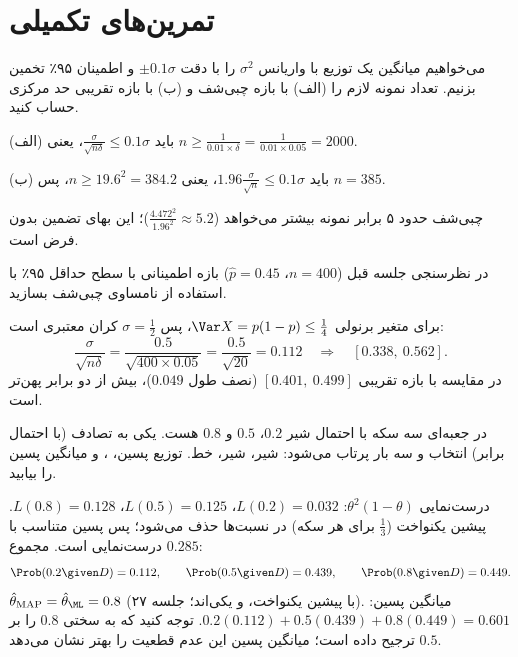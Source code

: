\section{تمرین‌های تکمیلی}

\begin{exercise}
می‌خواهیم میانگین یک توزیع با واریانس $\sigma^2$ را با دقت $\pm0.1\sigma$ و اطمینان ۹۵٪ تخمین بزنیم. تعداد نمونه لازم را (الف) با بازه چبی‌شف و (ب) با بازه تقریبی حد مرکزی حساب کنید.
\end{exercise}
\begin{solution}
(الف) باید $\frac{\sigma}{\sqrt{n\delta}}\le0.1\sigma$، یعنی $n\ge\frac{1}{0.01\times\delta}=\frac{1}{0.01\times0.05}=2000$.

(ب) باید $1.96\frac{\sigma}{\sqrt n}\le0.1\sigma$، یعنی $n\ge19.6^2=384.2$، پس $n=385$.

چبی‌شف حدود ۵ برابر نمونه بیشتر می‌خواهد ($\frac{4.472^2}{1.96^2}\approx5.2$)؛ این بهای تضمین بدون فرض است.
\end{solution}

\begin{exercise}
در نظرسنجی جلسه قبل ($n=400$، $\hat p=0.45$) بازه اطمینانی با سطح حداقل ۹۵٪ با استفاده از نامساوی چبی‌شف بسازید.
\end{exercise}
\begin{solution}
برای متغیر برنولی $\Var X=p(1-p)\le\frac14$، پس $\sigma=\frac12$ کران معتبری است:
\[
\frac{\sigma}{\sqrt{n\delta}}=\frac{0.5}{\sqrt{400\times0.05}}=\frac{0.5}{\sqrt{20}}=0.112
\quad\Rightarrow\quad[0.338,\ 0.562].
\]
در مقایسه با بازه تقریبی $[0.401,\ 0.499]$ (نصف طول $0.049$)، بیش از دو برابر پهن‌تر است.
\end{solution}

\begin{exercise}[سه سکه]
در جعبه‌ای سه سکه با احتمال شیر $0.2$، $0.5$ و $0.8$ هست. یکی به تصادف (با احتمال برابر) انتخاب و سه بار پرتاب می‌شود: شیر، شیر، خط. توزیع پسین، ،  و میانگین پسین را بیابید.
\end{exercise}
\begin{solution}
درست‌نمایی $\theta^2(1-\theta)$: $L(0.2)=0.032$، $L(0.5)=0.125$، $L(0.8)=0.128$. پیشین یکنواخت ($\frac13$ برای هر سکه) در نسبت‌ها حذف می‌شود؛ پس پسین متناسب با درست‌نمایی است. مجموع $0.285$:
\[
\Prob(0.2\given D)=0.112,\qquad\Prob(0.5\given D)=0.439,\qquad\Prob(0.8\given D)=0.449 .
\]
$\hat\theta_{\mathrm{MAP}}=\hat\theta_\ML=0.8$ (با پیشین یکنواخت،  و  یکی‌اند؛ جلسه ۲۷). میانگین پسین: $0.2(0.112)+0.5(0.439)+0.8(0.449)=0.601$. توجه کنید که  به سختی $0.8$ را بر $0.5$ ترجیح داده است؛ میانگین پسین این عدم قطعیت را بهتر نشان می‌دهد.
\end{solution}

